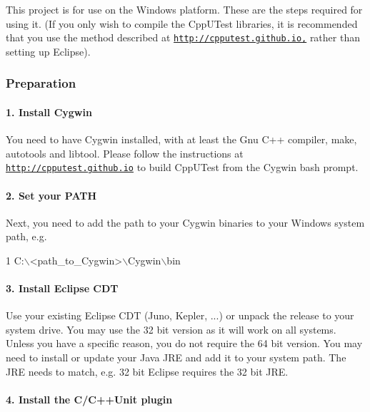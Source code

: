 This project is for use on the Windows platform. These are the steps required for using it. (If you only wish to compile the Cpp\+U\+Test libraries, it is recommended that you use the method described at \href{http://cpputest.github.io,}{\tt http\+://cpputest.\+github.\+io,} rather than setting up Eclipse).

\subsubsection*{Preparation}

\paragraph*{1. Install Cygwin}

You need to have Cygwin installed, with at least the Gnu C++ compiler, make, autotools and libtool. Please follow the instructions at \href{http://cpputest.github.io}{\tt http\+://cpputest.\+github.\+io} to build Cpp\+U\+Test from the Cygwin bash prompt.

\paragraph*{2. Set your P\+A\+TH}

Next, you need to add the path to your Cygwin binaries to your Windows system path, e.\+g. 
\begin{DoxyCode}
1 C:\(\backslash\)<path\_to\_Cygwin>\(\backslash\)Cygwin\(\backslash\)bin
\end{DoxyCode}


\paragraph*{3. Install Eclipse C\+DT}

Use your existing Eclipse C\+DT (Juno, Kepler, ...) or unpack the release to your system drive. You may use the 32 bit version as it will work on all systems. Unless you have a specific reason, you do not require the 64 bit version. You may need to install or update your Java J\+RE and add it to your system path. The J\+RE needs to match, e.\+g. 32 bit Eclipse requires the 32 bit J\+RE.

\paragraph*{4. Install the C/\+C++\+Unit plugin}

